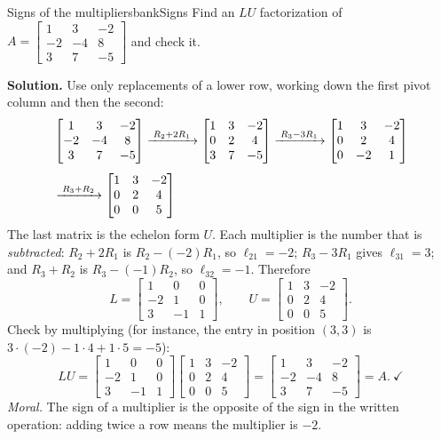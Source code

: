 \documentclass[11pt]{article}
\begin{document}
\begin{exmp}{Signs of the multipliers}{bankSigns}
Find an $LU$ factorization of $A=\begin{bmatrix}1&3&-2\\-2&-4&8\\3&7&-5\end{bmatrix}$ and check it.

\textbf{Solution.} Use only replacements of a lower row, working down the first pivot column and then the second:
\begin{align*}
&\begin{bmatrix}1&3&-2\\-2&-4&8\\3&7&-5\end{bmatrix}
\xrightarrow{\;R_2+2R_1\;}
\begin{bmatrix}1&3&-2\\0&2&4\\3&7&-5\end{bmatrix}
\xrightarrow{\;R_3-3R_1\;}
\begin{bmatrix}1&3&-2\\0&2&4\\0&-2&1\end{bmatrix}\\[4pt]
&\xrightarrow{\;R_3+R_2\;}
\begin{bmatrix}1&3&-2\\0&2&4\\0&0&5\end{bmatrix}
\end{align*}
The last matrix is the echelon form $U$. Each multiplier is the number that is \emph{subtracted}: $R_2+2R_1$ is $R_2-(-2)R_1$, so $\ell_{21}=-2$; $R_3-3R_1$ gives $\ell_{31}=3$; and $R_3+R_2$ is $R_3-(-1)R_2$, so $\ell_{32}=-1$. Therefore
\[
L=\begin{bmatrix}1&0&0\\-2&1&0\\3&-1&1\end{bmatrix},\qquad U=\begin{bmatrix}1&3&-2\\0&2&4\\0&0&5\end{bmatrix}.
\]
Check by multiplying (for instance, the entry in position $(3,3)$ is $3\cdot(-2)-1\cdot4+1\cdot5=-5$):
\[
LU=\begin{bmatrix}1&0&0\\-2&1&0\\3&-1&1\end{bmatrix}\begin{bmatrix}1&3&-2\\0&2&4\\0&0&5\end{bmatrix}=\begin{bmatrix}1&3&-2\\-2&-4&8\\3&7&-5\end{bmatrix}=A.\ \checkmark
\]
\emph{Moral.} The sign of a multiplier is the opposite of the sign in the written operation: adding twice a row means the multiplier is $-2$.
\end{exmp}
\end{document}
